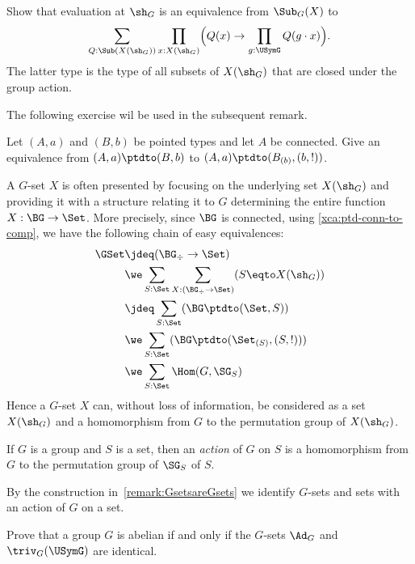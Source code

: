 \begin{xca}\label{xca:SubGX-closedSubXshG}
Show that evaluation at $\sh_G$ is an equivalence from $\Sub_G(X)$ to
\[
  \sum_{Q:\Sub(X(\sh_G))}
  \prod_{x:X(\sh_G)}
  \Bigl(Q(x)\to\prod_{g:\USymG} Q(g\cdot x)\Bigr).
\]
The latter type is the type of all
subsets of $X(\sh_G)$ that are closed under the group action.
\end{xca}

The following exercise wil be used in the subsequent remark.
\begin{xca}\label{xca:ptd-conn-to-comp}
Let $(A,a)$ and $(B,b)$ be pointed types and let $A$ be connected.
Give an equivalence from $(A,a)\ptdto(B,b)$ to
$(A,a)\ptdto(B_{(b)},(b,!))$.
\end{xca}

\begin{remark}
  \label{remark:GsetsareGsets}
  A $G$-set $X$ is often presented by focusing on the underlying set $X(\sh_G)$
  and providing it with a structure relating it to $G$ determining
  the entire function $X : \BG\to\Set$.
  More precisely, since $\BG$ is connected, 
  using \cref{xca:ptd-conn-to-comp},
  we have the following chain of easy equivalences:
  \begin{align*}
\GSet &\jdeq (\BG_\div\to\Set) \\
&\we \sum_{S:\Set} \sum_{X:(\BG_\div\to\Set)}(S\eqto X(\sh_G)) \\
&\jdeq \sum_{S:\Set} (\BG\ptdto(\Set,S)) \\
&\we \sum_{S:\Set} (\BG\ptdto(\Set_{(S)},(S,!))) \\
&\we \sum_{S:\Set} \Hom(G,\SG_S)
  \end{align*}
Hence a $G$-set $X$ can, without loss of information, be considered as
a set $X(\sh_G)$ and
a homomorphism from $G$ to the permutation group of $X(\sh_G)$.
\end{remark}

\begin{definition}\label{def:Gaction}
  If $G$ is a group and $S$ is a set, then an \emph{action}
  of $G$ on $S$
  is a homomorphism from $G$ to the permutation group of $\SG_S$ of $S$.%
\end{definition}
By the construction in~\cref{remark:GsetsareGsets} we identify $G$-sets
and sets with an action of $G$ on a set.

\begin{xca}\label{xca:Ad-triv-abelian}
  Prove that a group $G$ is abelian if and only if the $G$-sets $\Ad_G$ and
  $\triv_G(\USymG)$ are identical.
\end{xca}

